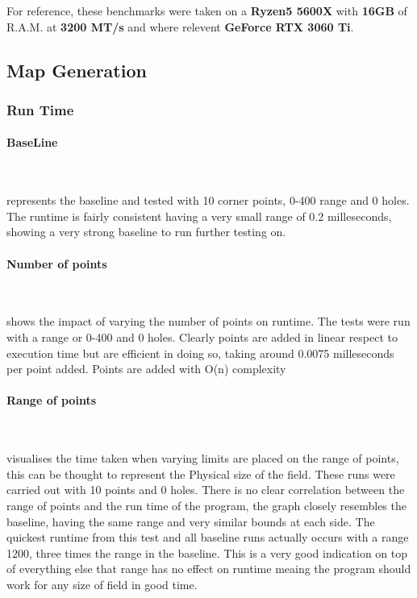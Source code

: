 \documentclass[final]{cmpreport_02}
\begin{document}
For reference, these benchmarks were taken on a \textbf{Ryzen5 5600X} with \textbf{16GB} of R.A.M. at \textbf{3200 MT/s} and where relevent \textbf{GeForce RTX 3060 Ti}.

\subsection{Map Generation}
\subsubsection{Run Time}
\paragraph{BaseLine} \

 represents the baseline and tested with 10 corner points, 0-400 range and 0 holes.
The runtime is fairly consistent having a very small range of 0.2 milleseconds, showing a very strong baseline to run further testing on.


\paragraph{Number of points} \

 shows the impact of varying the number of points on runtime.
The tests were run with a range or 0-400 and 0 holes.
Clearly points are added in linear respect to execution time but are efficient in doing so, taking around 0.0075 milleseconds per point added.
Points are added with O(n) complexity


\paragraph{Range of points} \

 visualises the time taken when varying limits are placed on the range of points, this can be thought to represent the Physical size of the field.
These runs were carried out with 10 points and 0 holes.
There is no clear correlation between the range of points and the run time of the program, the graph closely resembles the baseline, having the same range and very similar bounds at each side.
The quickest runtime from this test and all baseline runs actually occurs with a range 1200, three times the range in the baseline.
This is a very good indication on top of everything else that range has no effect on runtime meaing the program should work for any size of field in good time.
\end{document}
